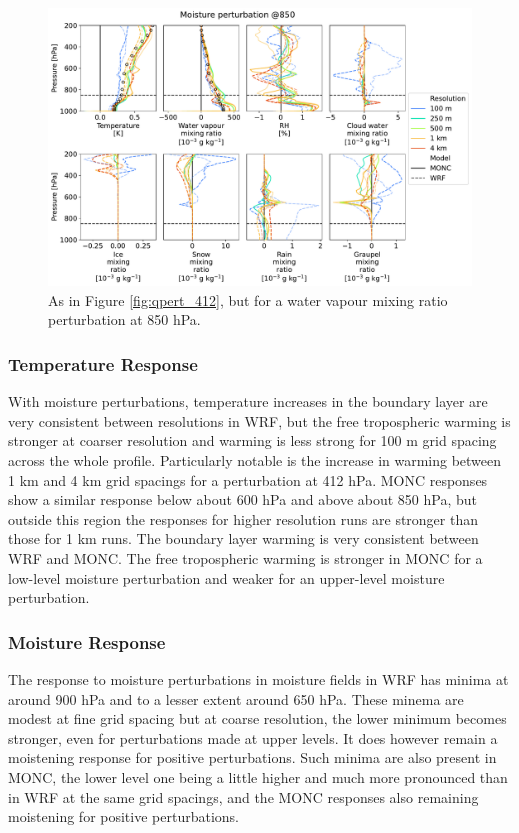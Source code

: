 \documentclass[draft]{agujournal2019}
\begin{document}
\begin{figure}[pth]
    \noindent\includegraphics[width=\textwidth]{figures/pert_diffs_q_0.0002_@850}
    \caption{As in Figure \ref{fig:qpert_412}, but for a water vapour mixing
    ratio perturbation at 850 hPa.}
    \label{fig:qpert_850}
\end{figure}

\subsubsection{Temperature Response}

With moisture perturbations, temperature increases in the boundary layer are very consistent
between resolutions in WRF, but the free tropospheric warming is stronger at
coarser resolution and warming is less strong for 100 m grid spacing across the
whole profile. Particularly notable is the increase in warming between 1 km and
4 km grid spacings for a perturbation at 412 hPa. MONC responses show a similar
response below about 600 hPa and above about 850 hPa, but outside this region
the responses for higher resolution runs are stronger than those for 1 km runs.
The boundary layer warming is very consistent between WRF and MONC. The free
tropospheric warming is stronger in MONC for a low-level moisture perturbation
and weaker for an upper-level moisture perturbation.

\subsubsection{Moisture Response}

The response to moisture perturbations in moisture fields in WRF has minima at
around 900 hPa and to a lesser extent around 650 hPa. These minema are modest at
fine grid spacing but at coarse resolution, the lower minimum becomes stronger,
even for perturbations made at upper levels. It does however remain a moistening
response for positive perturbations. Such minima are also present in MONC, the
lower level one being a little higher and much more pronounced than in WRF at
the same grid spacings, and the MONC responses also remaining moistening for
positive perturbations.
\end{document}
